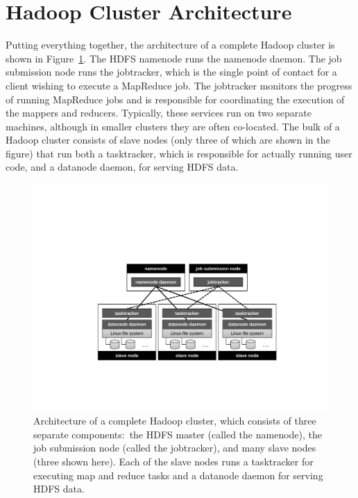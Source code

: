 \section{Hadoop Cluster Architecture}
\label{chapter2:cluster-architecture}

Putting everything together, the architecture of a complete Hadoop
cluster is shown in Figure~\ref{figure:chapter2:Hadoop-cluster}.  The
HDFS namenode runs the namenode daemon.  The job submission node runs
the jobtracker, which is the single point of contact for a client
wishing to execute a MapReduce job.  The jobtracker monitors the
progress of running MapReduce jobs and is responsible for coordinating
the execution of the mappers and reducers.  Typically, these services
run on two separate machines, although in smaller clusters they are
often co-located.  The bulk of a Hadoop cluster consists of slave
nodes (only three of which are shown in the figure) that run both a
tasktracker, which is responsible for actually running user code, and
a datanode daemon, for serving HDFS data.

\begin{figure}[t]
\begin{center}
\vspace{0.2cm}
\includegraphics[scale=0.6]{figures/fig-ch2-Hadoop.pdf}
\vspace{-0.3cm}
\end{center}
\caption{Architecture of a complete Hadoop cluster, which consists of
  three separate components:\ the HDFS master (called the namenode),
  the job submission node (called the jobtracker), and many slave
  nodes (three shown here).  Each of the slave nodes runs a
  tasktracker for executing map and reduce tasks and a datanode daemon
  for serving HDFS data.}
\label{figure:chapter2:Hadoop-cluster}
\end{figure}

